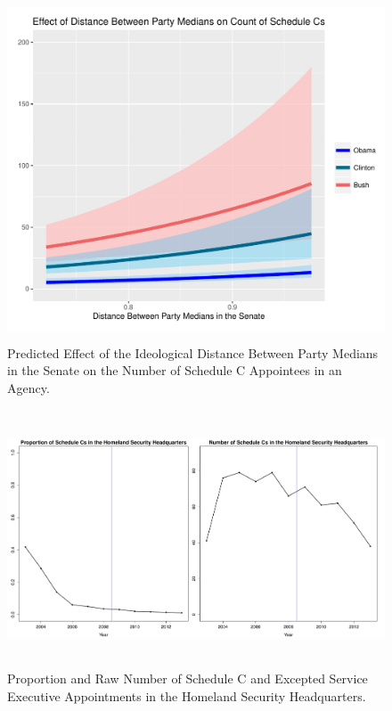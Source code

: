 \documentclass[12pt]{article}
\begin{document}
\newpage
\begin{figure}[!h]
\begin{center}
\includegraphics[height=4in,width=4.5in]{ResultsPlots.pdf}
\caption{Predicted Effect of the Ideological Distance Between Party Medians in the Senate on the Number of Schedule C Appointees in an Agency.}
\end{center}
\end{figure}

\newpage
\begin{figure}[!h]
\begin{center}
\includegraphics[height=3in,width=6in]{DHSProportionRawNumber.pdf}
\caption{Proportion and Raw Number of Schedule C and Excepted Service Executive Appointments in the Homeland Security Headquarters.}
\end{center}
\end{figure}
\end{document}
